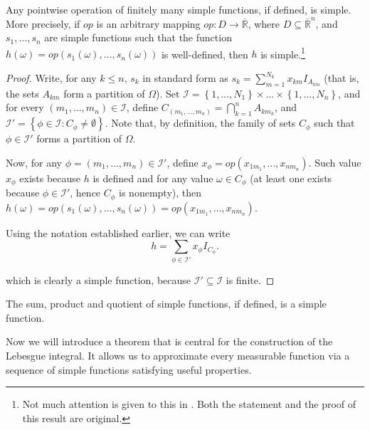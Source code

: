 \begin{lemm} Any pointwise operation of finitely many simple functions, if
defined, is simple. More precisely, if \(op\) is an arbitrary mapping
\(op\colon D\to\overline{\mathbb{R}}\), where \(D\subseteq\overline{\mathbb{R}}^n\), and \(s_1,\dots,s_n\) are
simple functions such that the function
\(h(\omega)=op(s_1(\omega),\dots,s_n(\omega))\) is well-defined, then \(h\) is
simple.\footnote{Not much attention is given to this in \cite{ash1972real}. Both the statement and the proof of this result are original.}
\end{lemm}
\begin{proof} Write, for any \(k\leq n\), \(s_k\) in standard form as
\(s_k=\sum_{m=1}^{N_k}x_{km}I_{A_{km}}\) (that is, the sets \(A_{km}\) form a
partition of \(\Omega\)). Set
\(\mathcal{I}=\left\{1,\dots,N_1\right\}\times\dots\times\left\{1,\dots,N_n\right\}\),
and for every \((m_1,\dots,m_n)\in\mathcal{I}\), define
\(C_{(m_1,\dots,m_n)}=\bigcap_{k=1}^{n}A_{km_k}\), and
\(\mathcal{I}'=\left\{\phi\in \mathcal{I}\colon C_{\phi}\neq\emptyset\right\}\).  Note
that, by definition, the family of sets \(C_{\phi}\) such that
\(\phi\in\mathcal{I}'\) forms a partition of \(\Omega\).
	
	Now, for any \(\phi=(m_1,\dots,m_n)\in\mathcal{I}'\), define
\(x_{\phi}=op(x_{1m_1},\dots,x_{nm_n})\). Such value \(x_\phi\) exists because
\(h\) is defined and for any value \(\omega\in C_\phi\) (at least one exists
because \(\phi\in\mathcal{I}'\), hence \(C_\phi\) is nonempty), then
\(h(\omega)=op(s_1(\omega),\dots,s_n(\omega))=op(x_{1m_1},\dots,x_{nm_n})\).
	
	Using the notation established earlier, we can write
	\[h=\sum_{\phi\in\mathcal{I}'}x_\phi I_{C_\phi}.\] 
	
	which is clearly a simple function, because
\(\mathcal{I}'\subseteq\mathcal{I}\) is finite.
\end{proof}
\begin{corl}\label{corollary:operation of simple functions is simple}
The sum, product and quotient of simple functions, if defined, is a simple function.
\end{corl}
Now we will introduce a theorem that is central for the construction of the
Lebesgue integral. It allows us to approximate every  measurable function via a
sequence of simple functions satisfying useful properties.

